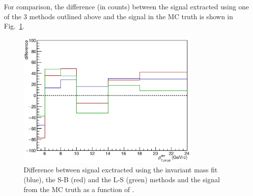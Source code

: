 For comparison, the difference (in counts) between the signal extracted using one of the 3 methods outlined above and the signal in the MC truth is shown in Fig.~\ref{fig:HQ16_Simulation_MethodComparison_Diff}.
\begin{figure}[tbh]
\begin{center}
\includegraphics[width=0.8\textwidth]{img/HQ16_Simulation_MethodComparison_Diff}
 \caption{Difference between signal exctracted using the invariant mass fit (blue), the S-B (red) and the L-S (green) methods and the signal from the MC truth as a function of \ptchjetgen.} 
 \label{fig:HQ16_Simulation_MethodComparison_Diff}
\end{center}
\end{figure}

